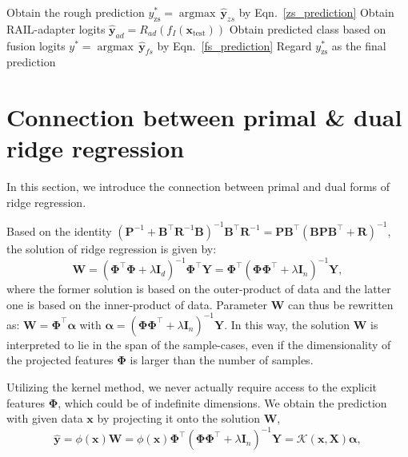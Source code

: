 \begin{algorithm}[hbt!]
\caption{RAIL testing}\label{alg:test}
\begin{algorithmic}
    \State Obtain the rough prediction $y^*_\text{zs} = {\operatorname{argmax}}\, \hat{\mathbf{y}}_{zs}$ by Eqn.~\ref{zs_prediction}
    \State Obtain RAIL-adapter logits $\hat{\mathbf{y}}_{ad} = R_{ad}\left(f_I\left(\mathbf{x}_\text{test}\right)\right)$
    \State Obtain predicted class based on fusion logits $y^* = {\operatorname{argmax}}\, \hat{\mathbf{y}}_{fs}$ by Eqn.~\ref{fs_prediction}
    \Else
    \State Regard $y^*_\text{zs}$ as the final prediction
  \EndIf
 \EndFor
\end{algorithmic}
\end{algorithm}

\newpage
\section{Connection between primal \& dual ridge regression}
\label{app_regression}
In this section, we introduce the connection between primal and dual forms of ridge regression.

Based on the identity $(\mathbf{P}^{-1} + \mathbf{B}^\top \mathbf{R}^{-1} \mathbf{B})^{-1} \mathbf{B}^\top \mathbf{R}^{-1} = \mathbf{P} \mathbf{B}^\top (\mathbf{B}\mathbf{P}\mathbf{B}^\top + \mathbf{R})^{-1}$, the solution of ridge regression is given by:
\begin{equation}
    \mathbf{W} = (\mathbf{\Phi}^\top \mathbf{\Phi} + \lambda \mathbf{I}_d)^{-1} \mathbf{\Phi}^\top \mathbf{Y} = \mathbf{\Phi}^\top (\mathbf{\Phi} \mathbf{\Phi}^\top + \lambda \mathbf{I}_n)^{-1} \mathbf{Y},
\end{equation}
where the former solution is based on the outer-product of data and the latter one is based on the inner-product of data. Parameter $\mathbf{W}$ can thus be rewritten as: $\mathbf{W} = \mathbf{\Phi}^\top \boldsymbol{\alpha}$ with $\boldsymbol{\alpha} = (\mathbf{\Phi} \mathbf{\Phi}^\top + \lambda \mathbf{I}_n)^{-1} \mathbf{Y}$. In this way, the solution $\mathbf{W}$ is interpreted to lie in the span of the sample-cases, even if the dimensionality of the projected features $\mathbf{\Phi}$ is larger than the number of samples.

Utilizing the kernel method, we never actually require access to the explicit features $\mathbf{\Phi}$, which could be of indefinite dimensions. We obtain the prediction with given data $\mathbf{x}$ by projecting it onto the solution $\mathbf{W}$,
\begin{equation}
    \mathbf{\hat{y}} = \phi\left(\mathbf{x}\right)\mathbf{W}  = \phi\left(\mathbf{x}\right) \mathbf{\Phi}^\top (\mathbf{\Phi} \mathbf{\Phi}^\top + \lambda \mathbf{I}_n)^{-1} \mathbf{Y} = \mathcal{K}\left(\mathbf{x}, \mathbf{X}\right) \boldsymbol{\alpha},
\end{equation}

